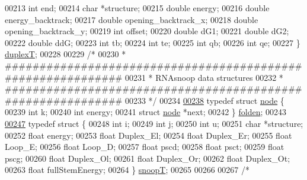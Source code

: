 \begin{DoxyCode}
00213   \textcolor{keywordtype}{int}     end;
00214   \textcolor{keywordtype}{char}    *structure;
00215   \textcolor{keywordtype}{double}  energy;
00216   \textcolor{keywordtype}{double}  energy\_backtrack;
00217   \textcolor{keywordtype}{double}  opening\_backtrack\_x;
00218   \textcolor{keywordtype}{double}  opening\_backtrack\_y;
00219   \textcolor{keywordtype}{int}     offset;
00220   \textcolor{keywordtype}{double}  dG1;
00221   \textcolor{keywordtype}{double}  dG2;
00222   \textcolor{keywordtype}{double}  ddG;
00223   \textcolor{keywordtype}{int}     tb;
00224   \textcolor{keywordtype}{int}     te;
00225   \textcolor{keywordtype}{int}     qb;
00226   \textcolor{keywordtype}{int}     qe;
00227 \} \hyperlink{group__data__structures_structduplexT}{duplexT};
00228 
00229 \textcolor{comment}{/*}
00230 \textcolor{comment}{ * ############################################################}
00231 \textcolor{comment}{ * RNAsnoop data structures}
00232 \textcolor{comment}{ * ############################################################}
00233 \textcolor{comment}{ */}
00234 
\hyperlink{group__data__structures}{00238} \textcolor{keyword}{typedef} \textcolor{keyword}{struct }\hyperlink{group__data__structures_structnode}{node} \{
00239   \textcolor{keywordtype}{int}         k;
00240   \textcolor{keywordtype}{int}         energy;
00241   \textcolor{keyword}{struct }\hyperlink{group__data__structures_structnode}{node} *next;
00242 \} \hyperlink{group__data__structures_gaaf402058651c8218fa72788d591cda05}{folden};
00243 
\hyperlink{group__data__structures}{00247} \textcolor{keyword}{typedef} \textcolor{keyword}{struct }\{
00248   \textcolor{keywordtype}{int}   i;
00249   \textcolor{keywordtype}{int}   j;
00250   \textcolor{keywordtype}{int}   u;
00251   \textcolor{keywordtype}{char}  *structure;
00252   \textcolor{keywordtype}{float} energy;
00253   \textcolor{keywordtype}{float} Duplex\_El;
00254   \textcolor{keywordtype}{float} Duplex\_Er;
00255   \textcolor{keywordtype}{float} Loop\_E;
00256   \textcolor{keywordtype}{float} Loop\_D;
00257   \textcolor{keywordtype}{float} pscd;
00258   \textcolor{keywordtype}{float} psct;
00259   \textcolor{keywordtype}{float} pscg;
00260   \textcolor{keywordtype}{float} Duplex\_Ol;
00261   \textcolor{keywordtype}{float} Duplex\_Or;
00262   \textcolor{keywordtype}{float} Duplex\_Ot;
00263   \textcolor{keywordtype}{float} fullStemEnergy;
00264 \} \hyperlink{group__data__structures_structsnoopT}{snoopT};
00265 
00266 
00267 \textcolor{comment}{/*}

\end{DoxyCode}
